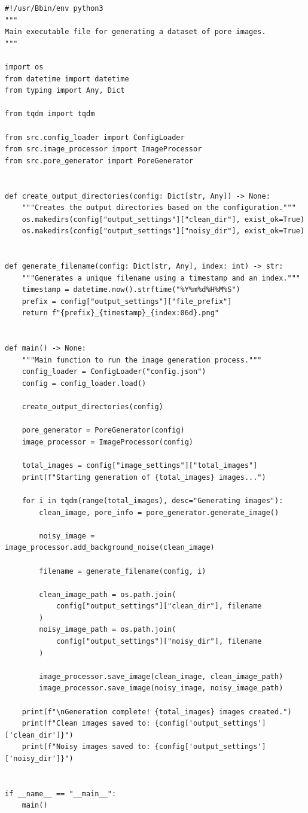 \documentclass[code]{wordcore}
\begin{document}
\begin{code}
	\begin{verbatim}
#!/usr/Bbin/env python3
"""
Main executable file for generating a dataset of pore images.
"""

import os
from datetime import datetime
from typing import Any, Dict

from tqdm import tqdm

from src.config_loader import ConfigLoader
from src.image_processor import ImageProcessor
from src.pore_generator import PoreGenerator


def create_output_directories(config: Dict[str, Any]) -> None:
    """Creates the output directories based on the configuration."""
    os.makedirs(config["output_settings"]["clean_dir"], exist_ok=True)
    os.makedirs(config["output_settings"]["noisy_dir"], exist_ok=True)


def generate_filename(config: Dict[str, Any], index: int) -> str:
    """Generates a unique filename using a timestamp and an index."""
    timestamp = datetime.now().strftime("%Y%m%d%H%M%S")
    prefix = config["output_settings"]["file_prefix"]
    return f"{prefix}_{timestamp}_{index:06d}.png"


def main() -> None:
    """Main function to run the image generation process."""
    config_loader = ConfigLoader("config.json")
    config = config_loader.load()

    create_output_directories(config)

    pore_generator = PoreGenerator(config)
    image_processor = ImageProcessor(config)

    total_images = config["image_settings"]["total_images"]
    print(f"Starting generation of {total_images} images...")

    for i in tqdm(range(total_images), desc="Generating images"):
        clean_image, pore_info = pore_generator.generate_image()

        noisy_image = image_processor.add_background_noise(clean_image)

        filename = generate_filename(config, i)

        clean_image_path = os.path.join(
            config["output_settings"]["clean_dir"], filename
        )
        noisy_image_path = os.path.join(
            config["output_settings"]["noisy_dir"], filename
        )

        image_processor.save_image(clean_image, clean_image_path)
        image_processor.save_image(noisy_image, noisy_image_path)

    print(f"\nGeneration complete! {total_images} images created.")
    print(f"Clean images saved to: {config['output_settings']['clean_dir']}")
    print(f"Noisy images saved to: {config['output_settings']['noisy_dir']}")


if __name__ == "__main__":
    main()
  \end{verbatim}
\end{code}
\end{document}
